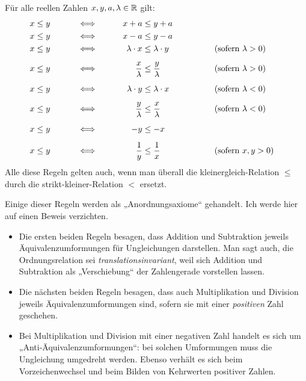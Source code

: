 \begin{satz} \label{ungleichungregeln}
    Für alle reellen Zahlen $x,y,a,\lambda\in \mathbb R$ gilt:
    \begingroup
    \allowdisplaybreaks
    \begin{alignat*}{4}
        x&\le y &\qquad&\iff&\qquad x+a&\le y+a \\
        x&\le y &\qquad&\iff&\qquad x-a&\le y-a \\
        x&\le y &\qquad&\iff&\qquad \lambda \cdot x&\le \lambda \cdot y &\qquad&\qquad (\textnormal{sofern $\lambda>0$}) \\[0.5em]
        x&\le y &\qquad&\iff&\qquad \frac{x}{\lambda} &\le \frac{y}{\lambda} &\qquad&\qquad (\textnormal{sofern $\lambda>0$}) \\[0.5em]
        x&\le y &\qquad&\iff&\qquad \lambda \cdot y&\le \lambda \cdot x &\qquad&\qquad (\textnormal{sofern $\lambda<0$}) \\[0.5em]
        x&\le y &\qquad&\iff&\qquad \frac{y}{\lambda} &\le \frac{x}{\lambda} &\qquad&\qquad (\textnormal{sofern $\lambda<0$}) \\[0.5em]
        x&\le y &\qquad &\iff&\qquad -y&\le -x \\[0.5em]
        x&\le y &\qquad&\iff&\qquad \frac{1}{y} & \le\frac{1}{x} &\qquad&\qquad (\textnormal{sofern $x,y>0$})
    \end{alignat*}
    \endgroup
    Alle diese Regeln gelten auch, wenn man überall die kleinergleich-Relation $\le$ durch die strikt-kleiner-Relation $<$ ersetzt.
\end{satz}


\begin{bem} \label{ungleichungerklaerung}
    Einige dieser Regeln werden als „Anordnungsaxiome“ gehandelt. Ich werde hier auf einen Beweis verzichten.
    \begin{itemize}
        \item Die ersten beiden Regeln besagen, dass Addition und Subtraktion jeweils Äquivalenz\-umformungen für Ungleichungen darstellen. Man sagt auch, die Ordnungsrelation sei \emph{translationsinvariant}, weil sich Addition und Subtraktion als „Verschiebung“ der Zahlengerade vorstellen lassen.
        \item Die nächsten beiden Regeln besagen, dass auch Multiplikation und Division jeweils Äquivalenzumformungen sind, sofern sie mit einer \emph{positiven} Zahl geschehen.
        \item Bei Multiplikation und Division mit einer negativen Zahl handelt es sich um „Anti-Äquivalenzumformungen“: bei solchen Umformungen muss die Ungleichung umgedreht werden. Ebenso verhält es sich beim Vorzeichenwechsel und beim Bilden von Kehrwerten positiver Zahlen.
    \end{itemize}
\end{bem}


